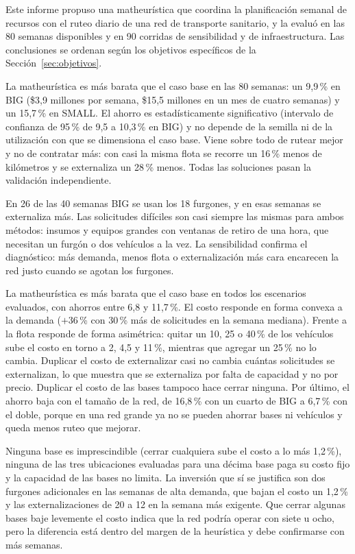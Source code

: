 Este informe propuso una matheurística que coordina la planificación semanal de recursos con el ruteo diario de una red de transporte sanitario, y la evaluó en las 80 semanas disponibles y en 90 corridas de sensibilidad y de infraestructura. Las conclusiones se ordenan según los objetivos específicos de la Sección~\ref{sec:objetivos}.

 La matheurística es más barata que el caso base en las 80 semanas: un 9,9\,\% en BIG (\$3,9 millones por semana, \$15,5 millones en un mes de cuatro semanas) y un 15,7\,\% en SMALL. El ahorro es estadísticamente significativo (intervalo de confianza de 95\,\% de 9,5 a 10,3\,\% en BIG) y no depende de la semilla ni de la utilización con que se dimensiona el caso base. Viene sobre todo de rutear mejor y no de contratar más: con casi la misma flota se recorre un 16\,\% menos de kilómetros y se externaliza un 28\,\% menos. Todas las soluciones pasan la validación independiente.

 En 26 de las 40 semanas BIG se usan los 18 furgones, y en esas semanas se externaliza más. Las solicitudes difíciles son casi siempre las mismas para ambos métodos: insumos y equipos grandes con ventanas de retiro de una hora, que necesitan un furgón o dos vehículos a la vez. La sensibilidad confirma el diagnóstico: más demanda, menos flota o externalización más cara encarecen la red justo cuando se agotan los furgones.

 La matheurística es más barata que el caso base en todos los escenarios evaluados, con ahorros entre 6,8 y 11,7\,\%. El costo responde en forma convexa a la demanda ($+36$\,\% con 30\,\% más de solicitudes en la semana mediana). Frente a la flota responde de forma asimétrica: quitar un 10, 25 o 40\,\% de los vehículos sube el costo en torno a 2, 4,5 y 11\,\%, mientras que agregar un 25\,\% no lo cambia. Duplicar el costo de externalizar casi no cambia cuántas solicitudes se externalizan, lo que muestra que se externaliza por falta de capacidad y no por precio. Duplicar el costo de las bases tampoco hace cerrar ninguna. Por último, el ahorro baja con el tamaño de la red, de 16,8\,\% con un cuarto de BIG a 6,7\,\% con el doble, porque en una red grande ya no se pueden ahorrar bases ni vehículos y queda menos ruteo que mejorar.

 Ninguna base es imprescindible (cerrar cualquiera sube el costo a lo más 1,2\,\%), ninguna de las tres ubicaciones evaluadas para una décima base paga su costo fijo y la capacidad de las bases no limita. La inversión que sí se justifica son dos furgones adicionales en las semanas de alta demanda, que bajan el costo un 1,2\,\% y las externalizaciones de 20 a 12 en la semana más exigente. Que cerrar algunas bases baje levemente el costo indica que la red podría operar con siete u ocho, pero la diferencia está dentro del margen de la heurística y debe confirmarse con más semanas.


